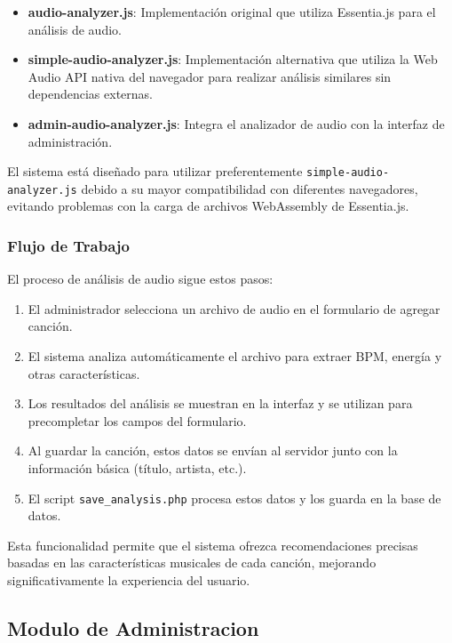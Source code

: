 \documentclass[a4paper,12pt]{article}
\begin{document}
\begin{itemize}
    \item \textbf{audio-analyzer.js}: Implementación original que utiliza Essentia.js para el análisis de audio.
    \item \textbf{simple-audio-analyzer.js}: Implementación alternativa que utiliza la Web Audio API nativa del navegador para realizar análisis similares sin dependencias externas.
    \item \textbf{admin-audio-analyzer.js}: Integra el analizador de audio con la interfaz de administración.
\end{itemize}

El sistema está diseñado para utilizar preferentemente \texttt{simple-audio-analyzer.js} debido a su mayor compatibilidad con diferentes navegadores, evitando problemas con la carga de archivos WebAssembly de Essentia.js.

\subsubsection{Flujo de Trabajo}

El proceso de análisis de audio sigue estos pasos:

\begin{enumerate}
    \item El administrador selecciona un archivo de audio en el formulario de agregar canción.
    \item El sistema analiza automáticamente el archivo para extraer BPM, energía y otras características.
    \item Los resultados del análisis se muestran en la interfaz y se utilizan para precompletar los campos del formulario.
    \item Al guardar la canción, estos datos se envían al servidor junto con la información básica (título, artista, etc.).
    \item El script \texttt{save\_analysis.php} procesa estos datos y los guarda en la base de datos.
\end{enumerate}

Esta funcionalidad permite que el sistema ofrezca recomendaciones precisas basadas en las características musicales de cada canción, mejorando significativamente la experiencia del usuario.

\subsection{Modulo de Administracion}
\end{document}

